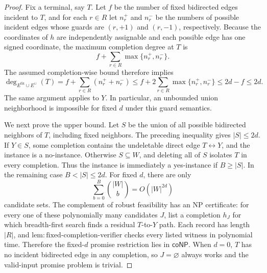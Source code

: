 \documentclass{article}
\begin{document}
\begin{proof}
Fix a terminal, say \(T\).  Let \(f\) be the number of fixed bidirected edges incident to \(T\), and for each \(r\in R\) let \(n_r^+\) and \(n_r^-\) be the numbers of possible incident edges whose guards are \((r,+1)\) and \((r,-1)\), respectively.  Because the coordinates of \(h\) are independently assignable and each possible edge has one signed coordinate, the maximum completion degree at \(T\) is
\[
 f+\sum_{r\in R}\max\{n_r^+,n_r^-\}.
\]
The assumed completion-wise bound therefore implies
\[
 \deg_{E^{\mathrm{fix}}\cup E^{\cup}}(T)
 =f+\sum_{r\in R}(n_r^++n_r^-)
 \le f+2\sum_{r\in R}\max\{n_r^+,n_r^-\}
 \le 2d-f\le2d.
\]
The same argument applies to \(Y\).  In particular, an unbounded union neighborhood is impossible for fixed \(d\) under this guard semantics.

We next prove the upper bound.  Let \(S\) be the union of all possible bidirected neighbors of \(T\), including fixed neighbors.  The preceding inequality gives \(|S|\le2d\).  If \(Y\in S\), some completion contains the undeletable direct edge \(T\leftrightarrow Y\), and the instance is a no-instance.  Otherwise \(S\subseteq W\), and deleting all of \(S\) isolates \(T\) in every completion.  Thus the instance is immediately a yes-instance if \(B\ge|S|\).  In the remaining case \(B<|S|\le2d\).  For fixed \(d\), there are only
\[
 \sum_{b=0}^{B}\binom{|W|}{b}=O(|W|^{2d})
\]
candidate sets.  The complement of robust feasibility has an NP certificate: for every one of these polynomially many candidates \(J\), list a completion \(h_J\) for which breadth-first search finds a residual \(T\)-to-\(Y\) path.  Each record has length \(|R|\), and \(\mathrm{lem{:}fixed\text{-}completion\text{-}verifier}\) checks every listed witness in polynomial time.  Therefore the fixed-\(d\) promise restriction lies in \(\mathsf{coNP}\).  When \(d=0\), \(T\) has no incident bidirected edge in any completion, so \(J=\varnothing\) always works and the valid-input promise problem is trivial.


\end{proof}
\end{document}
